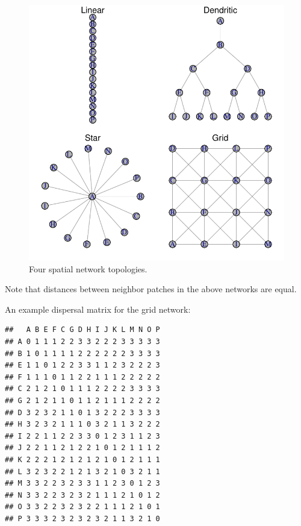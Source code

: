 \documentclass[
]{article}
\begin{document}
\begin{figure}[H]

{\centering \includegraphics{Managing_for_ecological_surprises_in_metapopulations_files/figure-latex/networks-1} 

}

\caption{Four spatial network topologies.}\label{fig:networks}
\end{figure}

Note that distances between neighbor patches in the above networks are
equal.

\newpage

An example dispersal matrix for the grid network:

\begin{verbatim}
##   A B E F C G D H I J K L M N O P
## A 0 1 1 1 2 2 3 3 2 2 2 3 3 3 3 3
## B 1 0 1 1 1 1 2 2 2 2 2 2 3 3 3 3
## E 1 1 0 1 2 2 3 3 1 1 2 3 2 2 2 3
## F 1 1 1 0 1 1 2 2 1 1 1 2 2 2 2 2
## C 2 1 2 1 0 1 1 1 2 2 2 2 3 3 3 3
## G 2 1 2 1 1 0 1 1 2 1 1 1 2 2 2 2
## D 3 2 3 2 1 1 0 1 3 2 2 2 3 3 3 3
## H 3 2 3 2 1 1 1 0 3 2 1 1 3 2 2 2
## I 2 2 1 1 2 2 3 3 0 1 2 3 1 1 2 3
## J 2 2 1 1 2 1 2 2 1 0 1 2 1 1 1 2
## K 2 2 2 1 2 1 2 1 2 1 0 1 2 1 1 1
## L 3 2 3 2 2 1 2 1 3 2 1 0 3 2 1 1
## M 3 3 2 2 3 2 3 3 1 1 2 3 0 1 2 3
## N 3 3 2 2 3 2 3 2 1 1 1 2 1 0 1 2
## O 3 3 2 2 3 2 3 2 2 1 1 1 2 1 0 1
## P 3 3 3 2 3 2 3 2 3 2 1 1 3 2 1 0
\end{verbatim}
\end{document}
